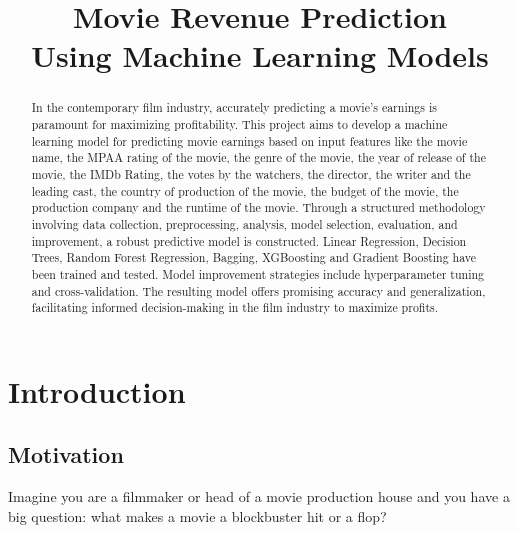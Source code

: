 \documentclass[conference]{IEEEtran}
\begin{document}
\title{Movie Revenue Prediction\\ Using Machine Learning Models}

\author{
     \vspace*{3.0pt}
    \and
     \vspace*{3.0pt}
}

\maketitle

\begin{abstract}
    In the contemporary film industry, accurately predicting a movie's earnings is paramount for maximizing profitability. This project aims to develop a machine learning model for predicting movie earnings based on input features like the movie name, the MPAA rating of the movie, the genre of the movie, the year of release of the movie, the IMDb Rating, the votes by the watchers, the director, the writer and the leading cast, the country of production of the movie, the budget of the movie, the production company and the runtime of the movie. Through a structured methodology involving data collection, preprocessing, analysis, model selection, evaluation, and improvement, a robust predictive model is constructed. Linear Regression, Decision Trees, Random Forest Regression, Bagging, XGBoosting and Gradient Boosting have been trained and tested. Model improvement strategies include hyperparameter tuning and cross-validation. The resulting model offers promising accuracy and generalization, facilitating informed decision-making in the film industry to maximize profits.
\end{abstract}

\IEEEpeerreviewmaketitle

\section{Introduction}
    \subsection{Motivation}
        Imagine you are a filmmaker or head of a movie production house and you have a big question: what makes a movie a blockbuster hit or a flop?
\end{document}
